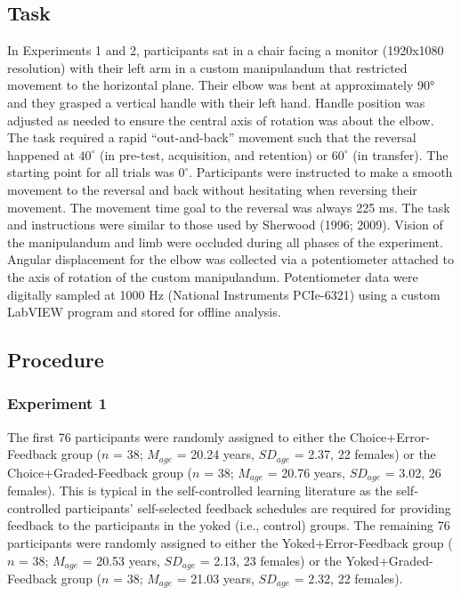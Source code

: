 \documentclass[
  man, donotrepeattitle,floatsintext]{apa7}
\begin{document}
\hypertarget{task}{%
\subsection{Task}\label{task}}

In Experiments 1 and 2, participants sat in a chair facing a monitor (1920x1080 resolution) with their left arm in a custom manipulandum that restricted movement to the horizontal plane. Their elbow was bent at approximately 90° and they grasped a vertical handle with their left hand. Handle position was adjusted as needed to ensure the central axis of rotation was about the elbow. The task required a rapid ``out-and-back'' movement such that the reversal happened at \(40^\circ\) (in pre-test, acquisition, and retention) or \(60^\circ\) (in transfer). The starting point for all trials was \(0^\circ\). Participants were instructed to make a smooth movement to the reversal and back without hesitating when reversing their movement. The movement time goal to the reversal was always 225 ms. The task and instructions were similar to those used by Sherwood (1996; 2009). Vision of the manipulandum and limb were occluded during all phases of the experiment. Angular displacement for the elbow was collected via a potentiometer attached to the axis of rotation of the custom manipulandum. Potentiometer data were digitally sampled at 1000 Hz (National Instruments PCIe-6321) using a custom LabVIEW program and stored for offline analysis.

\hypertarget{procedure}{%
\subsection{Procedure}\label{procedure}}

\hypertarget{experiment-1-1}{%
\subsubsection{Experiment 1}\label{experiment-1-1}}

The first 76 participants were randomly assigned to either the Choice+Error-Feedback group (\(n\) = 38; \(M_{age}\) = 20.24 years, \(SD_{age}\) = 2.37, 22 females) or the Choice+Graded-Feedback group (\(n\) = 38; \(M_{age}\) = 20.76 years, \(SD_{age}\) = 3.02, 26 females). This is typical in the self-controlled learning literature as the self-controlled participants' self-selected feedback schedules are required for providing feedback to the participants in the yoked (i.e., control) groups. The remaining 76 participants were randomly assigned to either the Yoked+Error-Feedback group (\(n\) = 38; \(M_{age}\) = 20.53 years, \(SD_{age}\) = 2.13, 23 females) or the Yoked+Graded-Feedback group (\(n\) = 38; \(M_{age}\) = 21.03 years, \(SD_{age}\) = 2.32, 22 females).
\end{document}
